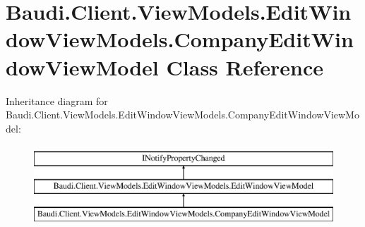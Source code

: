 \hypertarget{class_baudi_1_1_client_1_1_view_models_1_1_edit_window_view_models_1_1_company_edit_window_view_model}{}\section{Baudi.\+Client.\+View\+Models.\+Edit\+Window\+View\+Models.\+Company\+Edit\+Window\+View\+Model Class Reference}
\label{class_baudi_1_1_client_1_1_view_models_1_1_edit_window_view_models_1_1_company_edit_window_view_model}
Inheritance diagram for Baudi.\+Client.\+View\+Models.\+Edit\+Window\+View\+Models.\+Company\+Edit\+Window\+View\+Model\+:\begin{figure}[H]
\begin{center}
\leavevmode
\includegraphics[height=3.000000cm]{class_baudi_1_1_client_1_1_view_models_1_1_edit_window_view_models_1_1_company_edit_window_view_model}
\end{center}
\end{figure}
